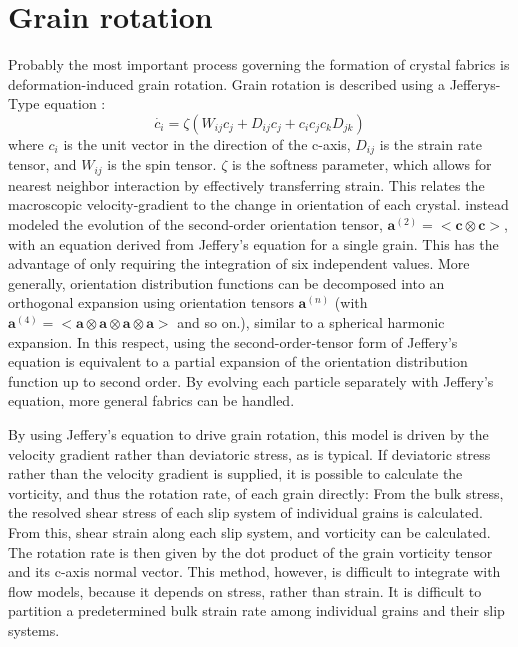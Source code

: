 \documentclass{igs}
\begin{document}
\section{Grain rotation}
Probably the most important process governing the formation of crystal fabrics is deformation-induced grain rotation. Grain rotation is described using a Jefferys-Type equation \citep{azuma94}:
\begin{equation}
   \dot{c_i} = \zeta \left( W_{ij}  c_j + D_{ij} c_j + c_i c_j c_k D_{jk} \right)
\end{equation}
where $c_i$ is the unit vector in the direction of the c-axis, $D_{ij}$ is the strain rate tensor, and $W_{ij}$ is the spin tensor. $\zeta$ is the softness parameter, which allows for nearest neighbor interaction by effectively transferring strain. This relates the macroscopic velocity-gradient to the change in orientation of each crystal. \citet{gillet2005} instead modeled the evolution of the  second-order orientation tensor, $\boldsymbol{a}^{(2)} = <\boldsymbol{c} \otimes \boldsymbol{c}>$, with an equation derived from Jeffery's equation for a single grain. This has the advantage of only requiring the integration of six independent values. More generally, orientation distribution functions can be decomposed into an orthogonal expansion using orientation tensors $\boldsymbol{a}^{(n)}$ (with $\boldsymbol{a}^{(4)} = < \boldsymbol{a} \otimes \boldsymbol{a} \otimes \boldsymbol{a} \otimes \boldsymbol{a}>$ and so on.), similar to a spherical harmonic expansion. In this respect, using the second-order-tensor form of Jeffery's equation is equivalent to a partial expansion of the orientation distribution function up to second order. By evolving each particle separately with Jeffery's equation, more general fabrics can be handled.

By using Jeffery's equation to drive grain rotation, this model is driven by the velocity gradient rather than deviatoric stress, as is typical. If deviatoric stress rather than the velocity gradient is supplied, it is possible to calculate the vorticity, and thus the rotation rate, of each grain directly: From the bulk stress, the resolved shear stress of each slip system of individual grains is calculated. From this, shear strain along each slip system, and vorticity can be calculated. The rotation rate is then given by the dot product of the grain vorticity tensor and its c-axis normal vector. This method, however, is difficult to integrate with flow models, because it depends on stress, rather than strain. It is difficult to partition a predetermined bulk strain rate among individual grains and their slip systems.
\end{document}

